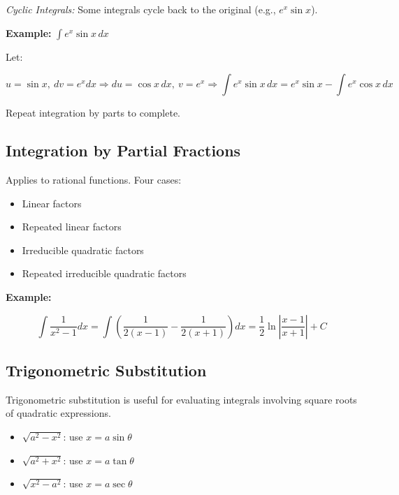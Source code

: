 \emph{Cyclic Integrals:} Some integrals cycle back to the original (e.g., \(e^x \sin x\)).

\textbf{Example:}
\vspace{\baselineskip}
 \(\int e^x \sin x\,dx\)

Let:

\[
    u = \sin x,\ dv = e^x dx \Rightarrow du = \cos x\,dx,\ v = e^x
    \Rightarrow \int e^x \sin x\,dx = e^x \sin x - \int e^x \cos x\,dx
\]

Repeat integration by parts to complete.

\subsection{Integration by Partial Fractions}

Applies to rational functions. Four cases:

\begin{itemize}

    \item Linear factors

    \item Repeated linear factors

    \item Irreducible quadratic factors

    \item Repeated irreducible quadratic factors

\end{itemize}

\textbf{Example:}
\vspace{\baselineskip}

\[
    \int \frac{1}{x^2 - 1} dx = \int \left( \frac{1}{2(x - 1)} - \frac{1}{2(x + 1)} \right) dx 
    = \frac{1}{2} \ln\left|\frac{x - 1}{x + 1}\right| + C
\]

\subsection{Trigonometric Substitution}

Trigonometric substitution is useful for evaluating integrals involving square roots of quadratic 
expressions.

\begin{itemize}

    \item \(\sqrt{a^2 - x^2}\): use \(x = a \sin \theta\)

    \item \(\sqrt{a^2 + x^2}\): use \(x = a \tan \theta\)

    \item \(\sqrt{x^2 - a^2}\): use \(x = a \sec \theta\)

\end{itemize}

